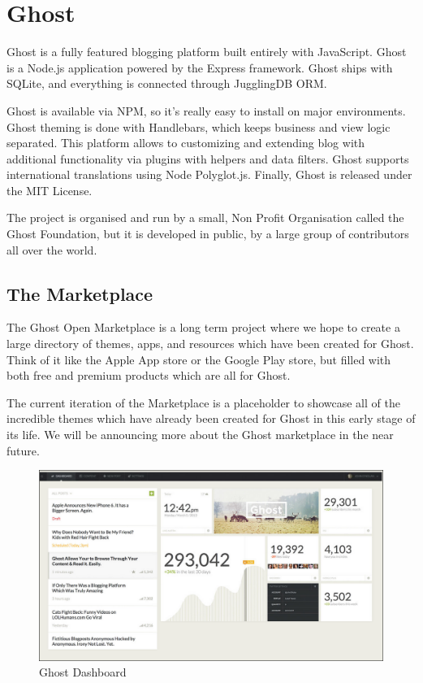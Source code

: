 \section{Ghost}
\label{sec:CMS_ghost}

Ghost is a fully featured blogging platform built entirely with JavaScript.
Ghost is a Node.js application powered by the Express framework. Ghost ships with SQLite, and everything is connected through JugglingDB ORM.

Ghost is available via NPM, so it’s really easy to install on major environments.
Ghost theming is done with Handlebars, which keeps business and view logic separated. 
This platform allows to customizing and extending blog with additional functionality via plugins with helpers and data filters. Ghost supports international translations using Node Polyglot.js.
Finally, Ghost is released under the MIT License. 

The project is organised and run by a small, Non Profit Organisation called the Ghost Foundation, but it is developed in public, by a large group of contributors all over the world.

\subsection{The Marketplace}
\label{subsec:ghost_market}
The Ghost Open Marketplace is a long term project where we hope to create a large directory of themes, apps, and resources which have been created for Ghost. Think of it like the Apple App store or the Google Play store, but filled with both free and premium products which are all for Ghost.

The current iteration of the Marketplace is a placeholder to showcase all of the incredible themes which have already been created for Ghost in this early stage of its life. We will be announcing more about the Ghost marketplace in the near future.




\begin {figure}[h]
\graphicspath{{images/chapter_cms/}}
\includegraphics[width=\textwidth]{ghost_dash}
\caption{Ghost Dashboard}
\end {figure}